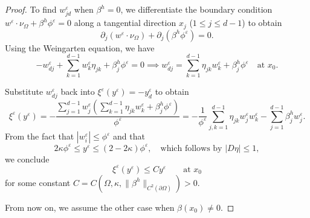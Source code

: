 \documentclass[11pt]{article}
\numberwithin{equation}{section}
\def\le{\leqslant}
\def\leq{\leqslant}
\begin{document}
\begin{proof}
To find $w^\varepsilon_{jd}$ when $\beta^h=0$, we differentiate the boundary condition
$w^\varepsilon \cdot \nu_\Omega + \beta^h \phi^\varepsilon = 0$ along a tangential
direction $x_j$ ($1\leq j\leq d-1$) to obtain
\[
\partial_j (w^\varepsilon \cdot \nu_\Omega) + \partial_j (\beta^h
\phi^\varepsilon) = 0.
\]
Using the Weingarten equation, we have
\[
-w^\varepsilon_{dj} + \sum_{k=1}^{d-1}
w^\varepsilon_k \eta_{jk} + \beta^h_j \phi^\varepsilon = 0 \implies
w^\varepsilon_{dj} = \sum_{k=1}^{d-1} \eta_{jk} w^\varepsilon_k + \beta^h_j
\phi^\varepsilon\quad\text{at }x_0.
\]

Substitute $w^\varepsilon_{dj}$ back into
$\xi^\varepsilon(y^\varepsilon) = -y^\varepsilon_d$ to obtain
\[
\xi^\varepsilon(y^\varepsilon) = -\frac{\sum_{j=1}^{d-1} w^\varepsilon_j
(\sum_{k=1}^{d-1} \eta_{jk} w^\varepsilon_k + \beta^h_j
\phi^\varepsilon)}{\phi^\varepsilon} = -\frac{1}{\phi^\varepsilon}
\sum_{j,k=1}^{d-1} \eta_{jk} w^\varepsilon_j w^\varepsilon_k - \sum_{j=1}^{d-1}
\beta^h_j w^\varepsilon_j.
\]
From the fact that $|w^\varepsilon_i| \le \phi^\varepsilon$ and that
\[
2\kappa\phi^{\varepsilon} \leq y^{\varepsilon} \leq (2-2\kappa)\phi^{\varepsilon},\quad\text{which follows by }|D\eta|\leq 1,
\]
we conclude $$\xi^\varepsilon(y^\varepsilon) \le Cy^\varepsilon\qquad\text{at }x_0$$ for some constant $C=C(\Omega,\kappa,\|\beta^h\|_{C^2(\partial\Omega)})>0$.

\medskip

From now on, we assume the other case when $\beta(x_0)\neq0$.

\medskip


\end{proof}
\end{document}

